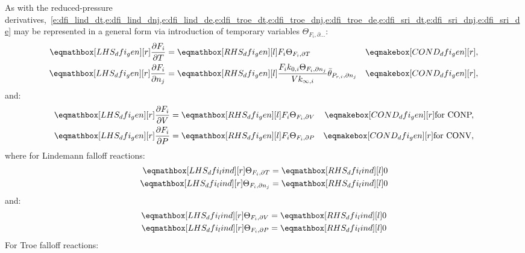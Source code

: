 \documentclass[12pt]{article}
\newcommand{\conp}{CONP}
\newcommand{\conv}{CONV}
\newcommand{\dconp}{\ifmmode\text{for \conp,}\else for \conp,\fi}
\newcommand{\dconv}{\ifmmode\text{for \conv,}\else for \conv.\fi}
\begin{document}
As with the reduced-pressure derivatives,~\cref{e:dfi_lind_dt,e:dfi_lind_dnj,e:dfi_lind_de,e:dfi_troe_dt,e:dfi_troe_dnj,e:dfi_troe_de,e:dfi_sri_dt,e:dfi_sri_dnj,e:dfi_sri_de} may be represented in a general form via introduction of temporary variables $\Theta_{F_i, \partial \ldots}$:
\begin{align}
\lhs{dfi_gen}{\frac{\partial F_{i} }{\partial T }} &= \rhs{dfi_gen}{F_{i} \Theta_{F_i, \partial T}} & \cond{dfi_gen}{,} \\
\lhs{dfi_gen}{\frac{\partial F_{i} }{\partial {n_j}}} &= \rhs{dfi_gen}{\frac{F_{i} k_{0, i} \Theta_{F_i, \partial n_j}}{V k_{\infty, i}} \bar{\theta}_{P_{r, i}, \partial n_j}} & \cond{dfi_gen}{,}
\end{align}
and:
\begin{subequations}
 \begin{align}
  \lhs{dfi_gen}{\frac{\partial F_{i} }{\partial V }} &= \rhs{dfi_gen}{F_{i} \Theta_{F_i, \partial V}} & \cond{dfi_gen}{\dconp} \\
  \lhs{dfi_gen}{\frac{\partial F_{i} }{\partial P }} &= \rhs{dfi_gen}{F_{i} \Theta_{F_i, \partial P}} & \cond{dfi_gen}{\dconv}
 \end{align}
\end{subequations}
where for Lindemann falloff reactions:
\begin{align}
\label{e:dfi_lind_dt_prod}
\lhs{dfi_lind}{\Theta_{F_i, \partial T}} &= \rhs{dfi_lind}{0} \\
\label{e:dfi_lind_dnj_prod}
\lhs{dfi_lind}{\Theta_{F_i, \partial n_j}} &= \rhs{dfi_lind}{0}
\end{align}
and:
\begin{subequations}
 \label{e:dfi_lind_de_prod}
 \begin{align}
  \lhs{dfi_lind}{\Theta_{F_i, \partial V}} &= \rhs{dfi_lind}{0} \\
  \lhs{dfi_lind}{\Theta_{F_i, \partial P}} &= \rhs{dfi_lind}{0}
 \end{align}
\end{subequations}
For Troe falloff reactions:
\end{document}
